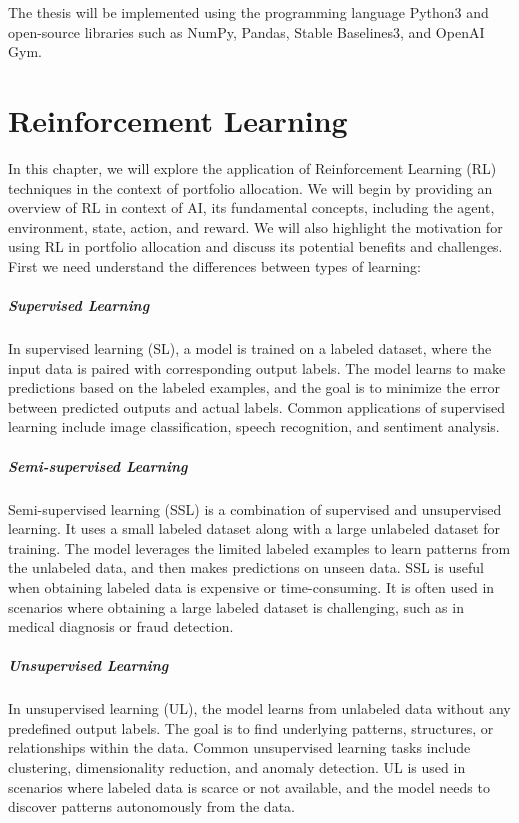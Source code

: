 The thesis will be implemented using the programming language Python3 and open-source libraries such as NumPy, Pandas, Stable Baselines3, and OpenAI Gym.




\chapter{Reinforcement Learning}\label{ch:reinforcement-learning}

In this chapter, we will explore the application of Reinforcement Learning (RL) techniques in the context of portfolio allocation.
We will begin by providing an overview of RL in context of AI, its fundamental concepts, including the agent, environment, state, action, and reward.
We will also highlight the motivation for using RL in portfolio allocation and discuss its potential benefits and challenges.
First we need understand the differences between types of learning:

\paragraph{Supervised Learning}
In supervised learning (SL), a model is trained on a labeled dataset, where the input data is paired with corresponding output labels.
The model learns to make predictions based on the labeled examples, and the goal is to minimize the error between predicted outputs and actual labels.
Common applications of supervised learning include image classification, speech recognition, and sentiment analysis.

\paragraph{Semi-supervised Learning}
Semi-supervised learning (SSL) is a combination of supervised and unsupervised learning.
It uses a small labeled dataset along with a large unlabeled dataset for training.
The model leverages the limited labeled examples to learn patterns from the unlabeled data, and then makes predictions on unseen data.
SSL is useful when obtaining labeled data is expensive or time-consuming.
It is often used in scenarios where obtaining a large labeled dataset is challenging, such as in medical diagnosis or fraud detection.

\paragraph{Unsupervised Learning}
In unsupervised learning (UL), the model learns from unlabeled data without any predefined output labels.
The goal is to find underlying patterns, structures, or relationships within the data.
Common unsupervised learning tasks include clustering, dimensionality reduction, and anomaly detection.
UL is used in scenarios where labeled data is scarce or not available, and the model needs to discover patterns autonomously from the data.

